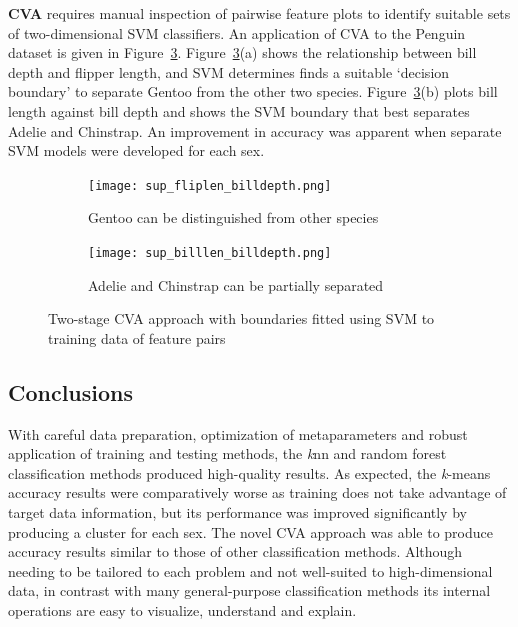 \documentclass[a4paper, 11pt]{article}
\begin{document}
\textbf{CVA}  
requires manual inspection of pairwise feature plots 
to identify suitable sets of two-dimensional SVM classifiers. 
An application of CVA to the Penguin dataset is given in Figure~\ref{fig:CVA}. 
Figure~\ref{fig:CVA}(a) shows the relationship between bill depth and flipper length, and
SVM determines finds a suitable `decision boundary' to separate Gentoo from the other two species. 
Figure~\ref{fig:CVA}(b) plots bill length against bill depth and shows the SVM boundary that best 
separates Adelie and Chinstrap. An improvement in accuracy
was apparent when separate SVM models were developed for each sex.

\begin{figure}[!ht]
    \vspace{-0.5\baselineskip} %
    \begin{subfigure}{0.47\textwidth}
    \centering
    \texttt{[image: sup\_fliplen\_billdepth.png]} %
    \caption{Gentoo can be distinguished from other species}
    \vspace{-1.5\baselineskip} %
    \label{fig:CVA_part_a}
  \end{subfigure}
  \hfill
  \begin{subfigure}{0.47\textwidth}
    \centering
    \texttt{[image: sup\_billlen\_billdepth.png]} %
    \caption{Adelie and Chinstrap can be partially separated}
    \vspace{-1.5\baselineskip} %
    \label{fig:CVA_part_b}
  \end{subfigure}
  \vspace{1\baselineskip} %
  \caption{\centering\linespread{0.8}\selectfont Two-stage CVA approach with boundaries fitted using SVM 
  to training data of feature pairs}
  \label{fig:CVA}
  \vspace{-2\baselineskip} %
\end{figure}
\subsection*{Conclusions}

With careful data preparation, optimization of metaparameters and robust application of training and testing methods, 
the \textit{k}nn and random forest classification methods produced high-quality results. 
As expected, the \textit{k}-means accuracy results were comparatively worse
as training does not take advantage of target data information, but its performance was improved 
significantly by producing a cluster for each sex. 
The novel CVA approach was able to produce accuracy results similar to those of other classification methods. 
Although needing to be tailored to each problem and not well-suited to high-dimensional data, 
in contrast with many general-purpose classification methods 
its internal operations are easy to visualize, understand and explain.
\end{document}
